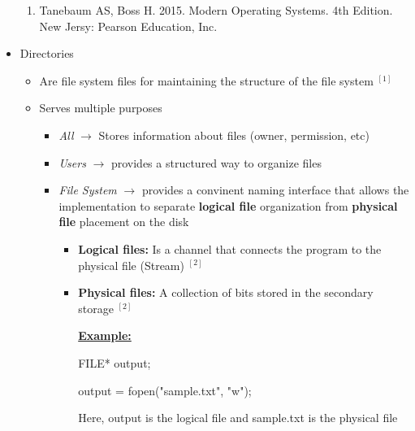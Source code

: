 \documentclass[12pt]{article}
\begin{document}
\begin{itemize}
    \begin{enumerate}[1)]
        \item Tanebaum AS, Boss H. 2015. Modern Operating Systems. 4th Edition. New Jersy: Pearson Education, Inc.
    \end{enumerate}
    \item Directories
    \begin{itemize}
        \item Are file system files for maintaining the structure of the file
        system $^{[1]}$
        \item Serves multiple purposes
        \begin{itemize}
            \item \textit{All} $\to$ Stores information about files (owner, permission, etc)
            \item \textit{Users} $\to$ provides a structured way to organize files
            \item \textit{File System} $\to$ provides a convinent naming interface
            that allows the implementation to separate \textbf{logical file} organization
            from \textbf{physical file} placement on the disk

            \bigskip

            \begin{itemize}
                \item \textbf{Logical files:} Is a channel that connects the program
                to the physical file (Stream) $^{[2]}$
                \item \textbf{Physical files:} A collection of bits stored in the
                secondary storage $^{[2]}$

                \bigskip

                \underline{\textbf{Example:}}

                \bigskip

                FILE* output;

                output = fopen("sample.txt", "w");

                \bigskip

                Here, output is the logical file and sample.txt is the physical file
            \end{itemize}


\end{itemize}
\end{itemize}
\end{itemize}
\end{document}
